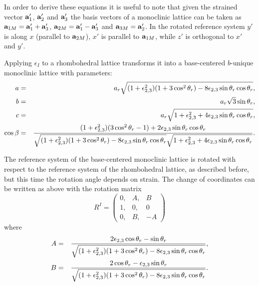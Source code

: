 \documentclass[12pt,a4paper,twoside]{report}
\begin{document}
In order to derive these equations it is useful to note that given the
strained vector ${\bf a}'_1$, ${\bf a}'_2$ and ${\bf a}'_3$ the basis
vectors of a monoclinic lattice can be taken as ${\bf a}_{1M}= {\bf a}'_1+
{\bf a}'_3$, ${\bf a}_{2M}= {\bf a}'_1- {\bf a}'_3$ and
${\bf a}_{3M}={\bf a}'_2$. In the rotated reference system $y'$ is along
$x$ (parallel to ${\bf a}_{2M}$), $x'$ is parallel to ${\bf a}_{1M}$, 
while $z'$ is orthogonal to $x'$ and $y'$.

Applying $\epsilon_I$ to a rhombohedral lattice transforms it into a
base-centered $b$-unique monoclinic lattice with parameters:
\begin{eqnarray}
a&=&a_r \sqrt{(1+\epsilon_{2,3}^2)(1 + 3 \cos^2 \theta_r)-
8\epsilon_{2,3}\sin \theta_r\cos \theta_r}, \\
b&=&a_r \sqrt{3}\sin \theta_r, \\
c&=&a_r \sqrt{1+\epsilon_{2,3}^2+4\epsilon_{2,3}\sin \theta_r\cos \theta_r}, \\
\cos\beta &=& {(1+\epsilon_{2,3}^2) (3 \cos^2 \theta_r-1) 
+ 2 \epsilon_{2,3} \sin \theta_r\cos \theta_r
\over \sqrt{(1+\epsilon_{2,3}^2)(1 + 3 \cos^2 \theta_r)-
8\epsilon_{2,3}\sin \theta_r\cos \theta_r} \sqrt{1+\epsilon_{2,3}^2+4\epsilon_{2,3}\sin \theta_r\cos \theta_r}}.
\end{eqnarray}

The reference system of the base-centered monoclinic lattice is rotated 
with respect to the reference system of the rhombohedral lattice, as 
described before, but this time the rotation angle depends on strain.
The change of coordinates can be written as above with the rotation matrix 
\begin{equation}
R^I=\left( \begin{array}{ccc}
0, & A, &  B\\
1, & 0, & 0  
\\
0, & B, & -A 
\end{array}
\right)
\end{equation}
where
\begin{eqnarray}
A&=& {2 \epsilon_{2,3} \cos \theta_r - \sin \theta_r \over 
\sqrt{(1+\epsilon_{2,3}^2)(1 + 3 \cos^2 \theta_r)-
8\epsilon_{2,3}\sin \theta_r\cos \theta_r}}, \\
B&=& {2 \cos \theta_r - \epsilon_{2,3} \sin \theta_r \over 
\sqrt{(1+\epsilon_{2,3}^2)(1 + 3 \cos^2 \theta_r)-
8\epsilon_{2,3}\sin \theta_r\cos \theta_r}}.
\end{eqnarray}
\end{document}
